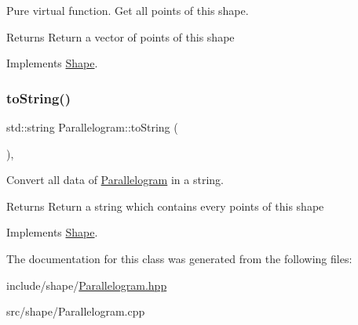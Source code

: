 Pure virtual function. Get all points of this shape. 

\begin{DoxyReturn}{Returns}
Return a vector of points of this shape 
\end{DoxyReturn}


Implements \hyperlink{classShape_a6eb0d80cccc44cb72b06c61d9780bc6b}{Shape}.

\mbox{\label{classParallelogram_a9caae0044f23d8a1e87b1a78d852c37f}} 
\subsubsection{\texorpdfstring{to\+String()}{toString()}}
{\footnotesize\ttfamily std\+::string Parallelogram\+::to\+String (\begin{DoxyParamCaption}{ }\end{DoxyParamCaption})\hspace{0.3cm}{\ttfamily [override]}, {\ttfamily [virtual]}}



Convert all data of \hyperlink{classParallelogram}{Parallelogram} in a string. 

\begin{DoxyReturn}{Returns}
Return a string which contains every points of this shape 
\end{DoxyReturn}


Implements \hyperlink{classShape_a98fa87c6dc4c7045fd6897a8f3bc186c}{Shape}.



The documentation for this class was generated from the following files\+:\begin{DoxyCompactItemize}
\item 
include/shape/\hyperlink{Parallelogram_8hpp}{Parallelogram.\+hpp}\item 
src/shape/Parallelogram.\+cpp\end{DoxyCompactItemize}
